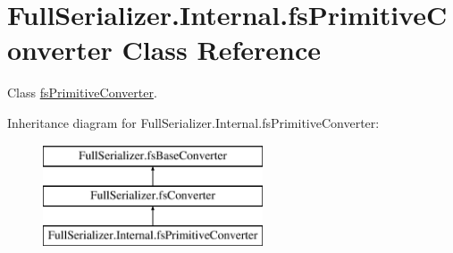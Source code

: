 \hypertarget{class_full_serializer_1_1_internal_1_1fs_primitive_converter}{}\section{Full\+Serializer.\+Internal.\+fs\+Primitive\+Converter Class Reference}
\label{class_full_serializer_1_1_internal_1_1fs_primitive_converter}


Class \hyperlink{class_full_serializer_1_1_internal_1_1fs_primitive_converter}{fs\+Primitive\+Converter}.  


Inheritance diagram for Full\+Serializer.\+Internal.\+fs\+Primitive\+Converter\+:\begin{figure}[H]
\begin{center}
\leavevmode
\includegraphics[height=3.000000cm]{class_full_serializer_1_1_internal_1_1fs_primitive_converter}
\end{center}
\end{figure}
